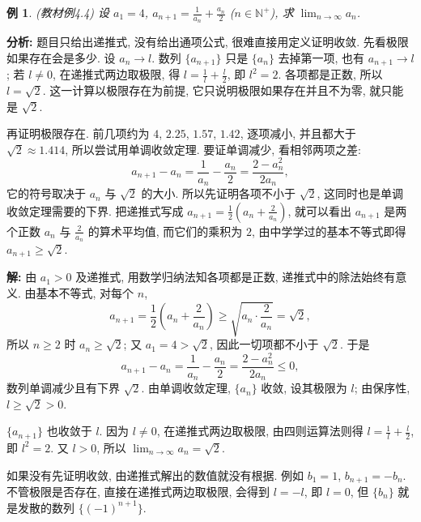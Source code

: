 \documentclass[UTF8,openany]{ctexbook}
\theoremstyle{chinesetextbook}
\newtheorem{example}{例}[section]
\newenvironment{cnsolution}{\par\indent\textbf{解:} \ignorespaces}{\par}
\begin{document}
\begin{example}\label{ex:4-4}
\textnormal{(教材例4.4)} 设 $a_1=4$, $\displaystyle a_{n+1}=\frac1{a_n}+\frac{a_n}2$ ($n\in\mathbb N^+$), 求 $\displaystyle\lim_{n\to\infty}a_n$.
\end{example}
\par\indent\textbf{分析:} 题目只给出递推式, 没有给出通项公式, 很难直接用定义证明收敛. 先看极限如果存在会是多少. 设 $a_n\to l$. 数列 $\{a_{n+1}\}$ 只是 $\{a_n\}$ 去掉第一项, 也有 $a_{n+1}\to l$; 若 $l\ne0$, 在递推式两边取极限, 得 $\displaystyle l=\frac1l+\frac l2$, 即 $l^2=2$. 各项都是正数, 所以 $l=\sqrt2$. 这一计算以极限存在为前提, 它只说明极限如果存在并且不为零, 就只能是 $\sqrt2$.

再证明极限存在. 前几项约为 $4$, $2.25$, $1.57$, $1.42$, 逐项减小, 并且都大于 $\sqrt2\approx1.414$, 所以尝试用单调收敛定理. 要证单调减少, 看相邻两项之差:
\[
a_{n+1}-a_n=\frac1{a_n}-\frac{a_n}2=\frac{2-a_n^2}{2a_n},
\]
它的符号取决于 $a_n$ 与 $\sqrt2$ 的大小. 所以先证明各项不小于 $\sqrt2$, 这同时也是单调收敛定理需要的下界. 把递推式写成 $\displaystyle a_{n+1}=\frac12\left(a_n+\frac2{a_n}\right)$, 就可以看出 $a_{n+1}$ 是两个正数 $a_n$ 与 $\displaystyle\frac2{a_n}$ 的算术平均值, 而它们的乘积为 $2$, 由中学学过的基本不等式即得 $a_{n+1}\ge\sqrt2$.
\begin{cnsolution}
由 $a_1>0$ 及递推式, 用数学归纳法知各项都是正数, 递推式中的除法始终有意义. 由基本不等式, 对每个 $n$,
\[
a_{n+1}=\frac12\left(a_n+\frac2{a_n}\right)\ge\sqrt{a_n\cdot\frac2{a_n}}=\sqrt2,
\]
所以 $n\ge2$ 时 $a_n\ge\sqrt2$; 又 $a_1=4>\sqrt2$, 因此一切项都不小于 $\sqrt2$. 于是
\[
a_{n+1}-a_n=\frac1{a_n}-\frac{a_n}2=\frac{2-a_n^2}{2a_n}\le0,
\]
数列单调减少且有下界 $\sqrt2$. 由单调收敛定理, $\{a_n\}$ 收敛, 设其极限为 $l$; 由保序性, $l\ge\sqrt2>0$.

$\{a_{n+1}\}$ 也收敛于 $l$. 因为 $l\ne0$, 在递推式两边取极限, 由四则运算法则得 $\displaystyle l=\frac1l+\frac l2$, 即 $l^2=2$. 又 $l>0$, 所以 $\displaystyle\lim_{n\to\infty}a_n=\sqrt2$.
\end{cnsolution}
如果没有先证明收敛, 由递推式解出的数值就没有根据. 例如 $b_1=1$, $b_{n+1}=-b_n$. 不管极限是否存在, 直接在递推式两边取极限, 会得到 $l=-l$, 即 $l=0$, 但 $\{b_n\}$ 就是发散的数列 $\{(-1)^{n+1}\}$.
\end{document}
